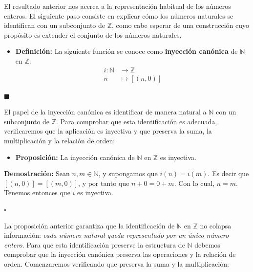 \documentclass[10 pt]{article}
\begin{document}
\Large{El resultado anterior nos acerca a la representación habitual de los números enteros. El siguiente paso consiste en explicar cómo los números naturales se identifican con un subconjunto de $\mathbb Z$, como cabe esperar de una construcción cuyo propósito es extender el conjunto de los números naturales.} \\

\begin{itemize}
    \item \Large{\textbf{Definición:} La siguiente función se conoce como \textbf{inyección canónica} de $\mathbb N$ en $\mathbb Z$:} 
    \begin{align*}
        i:\mathbb N &\rightarrow \mathbb Z \\
        n &\mapsto [(n,0)]
    \end{align*}
\end{itemize}
\begin{flushright}
    $\blacksquare$
\end{flushright}

\Large{El papel de la inyección canónica es identificar de manera natural a $\mathbb N$ con un subconjunto de $\mathbb Z$. Para comprobar que esta identificación es adecuada, verificaremos que la aplicación es inyectiva y que preserva la suma, la multiplicación y la relación de orden:} \\

\begin{itemize}
    \item \Large{\textbf{Proposición:} La inyección canónica de $\mathbb N$ en $\mathbb Z$ es inyectiva.} \\
\end{itemize}

\Large{\textbf{Demostración:} Sean $n,m \in \mathbb N$, y supongamos que $i(n)=i(m)$. Es decir que $[(n,0)]=[(m,0)]$, y por tanto que $n+0=0+m$. Con lo cual, $n=m$. Tenemos entonces que $i$ es inyectiva.} \\

\begin{flushright}
    $\square$
\end{flushright}

\Large{La proposición anterior garantiza que la identificación de $\mathbb N$ en $\mathbb Z$ no colapsa información: \textit{cada número natural queda representado por un único número entero}. Para que esta identificación preserve la estructura de $\mathbb N$ debemos comprobar que la inyección canónica preserva las operaciones y la relación de orden. Comenzaremos verificando que preserva la suma y la multiplicación:} \\
\end{document}
